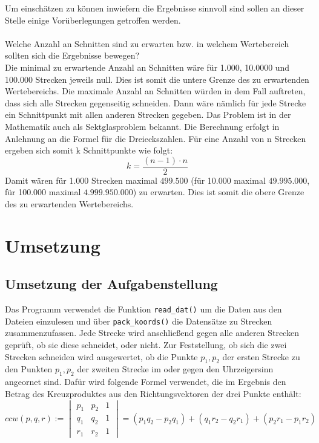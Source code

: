 \documentclass[12pt]{scrartcl}
\newcommand{\code}[1]{\texttt{#1}}
\begin{document}
Um einschätzen zu können inwiefern die Ergebnisse sinnvoll sind sollen an dieser Stelle einige Vorüberlegungen getroffen werden.\\~\\
Welche Anzahl an Schnitten sind zu erwarten bzw. in welchem Wertebereich sollten sich die Ergebnisse bewegen?\\
Die minimal zu erwartende Anzahl an Schnitten wäre für 1.000, 10.0000 und 100.000 Strecken jeweils null.
Dies ist somit die untere Grenze des zu erwartenden Wertebereichs.
Die maximale Anzahl an Schnitten würden in dem Fall auftreten, dass sich alle Strecken gegenseitig schneiden.
Dann wäre nämlich für jede Strecke ein Schnittpunkt mit allen anderen Strecken gegeben.
Das Problem ist in der Mathematik auch als Sektglasproblem bekannt.
Die Berechnung erfolgt in Anlehnung an die Formel für die Dreieckszahlen.
Für eine Anzahl von n Strecken ergeben sich somit k Schnittpunkte wie folgt:
\begin{equation}
k = \frac{(n-1) \cdot n}{2}
\end{equation}
Damit wären für 1.000 Strecken maximal $499.500$ (für 10.000 maximal $49.995.000$,
für 100.000 maximal $4.999.950.000$) zu erwarten.
Dies ist somit die obere Grenze des zu erwartenden Wertebereichs.

\section{Umsetzung}

\subsection{Umsetzung der Aufgabenstellung}

Das Programm verwendet die Funktion \code{read\_dat()} um die Daten aus den Dateien einzulesen und über \code{pack\_koords()} die Datensätze zu Strecken zusammenzufassen.
Jede Strecke wird anschließend gegen alle anderen Strecken geprüft, ob sie diese schneidet, oder nicht.
Zur Feststellung, ob sich die zwei Strecken schneiden wird ausgewertet, ob die Punkte $p_1, p_2$ der ersten Strecke zu den Punkten $p_1, p_2$ der zweiten Strecke im oder gegen den Uhrzeigersinn angeornet sind.
Dafür wird folgende Formel verwendet, die im Ergebnis den Betrag des Kreuzproduktes aus den Richtungsvektoren der drei Punkte enthält:
\begin{equation}
    ccw(p, q, r) := \begin{vmatrix} p_1 & p_2 & 1 \\ q_1 & q_2 & 1 \\ r_1 & r_2 & 1 \end{vmatrix} = (p_1q_2 - p_2q_1) + (q_1r_2 - q_2r_1) + (p_2r_1 - p_1r_2)
\end{equation}
\end{document}
